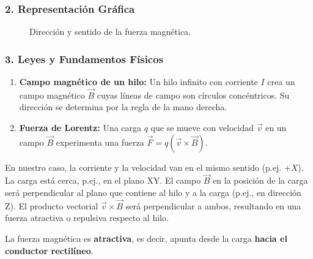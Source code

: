 \subsubsection*{2. Representación Gráfica}
\begin{figure}[H]
    \centering
    \caption{Dirección y sentido de la fuerza magnética.}
\end{figure}

\subsubsection*{3. Leyes y Fundamentos Físicos}
\begin{enumerate}
    \item \textbf{Campo magnético de un hilo:} Un hilo infinito con corriente $I$ crea un campo magnético $\vec{B}$ cuyas líneas de campo son círculos concéntricos. Su dirección se determina por la regla de la mano derecha.
    \item \textbf{Fuerza de Lorentz:} Una carga $q$ que se mueve con velocidad $\vec{v}$ en un campo $\vec{B}$ experimenta una fuerza $\vec{F} = q(\vec{v} \times \vec{B})$.
\end{enumerate}
En nuestro caso, la corriente y la velocidad van en el mismo sentido (p.ej. $+X$). La carga está cerca, p.ej., en el plano XY. El campo $\vec{B}$ en la posición de la carga será perpendicular al plano que contiene al hilo y a la carga (p.ej., en dirección Z). El producto vectorial $\vec{v} \times \vec{B}$ será perpendicular a ambos, resultando en una fuerza atractiva o repulsiva respecto al hilo.

\begin{cajaresultado}
La fuerza magnética es \textbf{atractiva}, es decir, apunta desde la carga \textbf{hacia el conductor rectilíneo}.
\end{cajaresultado}

